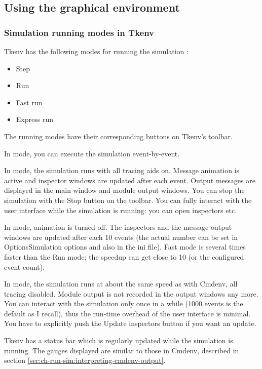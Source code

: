 \subsection{Using the graphical environment}

\subsubsection{Simulation running modes in Tkenv}


Tkenv has the following modes for running the simulation :

\begin{itemize}
   \item{Step}
   \item{Run}
   \item{Fast run}
   \item{Express run}
\end{itemize}


The running modes have their corresponding buttons on Tkenv's
toolbar.


In  mode, you can execute the simulation event-by-event.

In  mode, the simulation runs with all tracing aids on.
Message animation is active and inspector windows are updated
after each event. Output messages are displayed in the main window
and module output windows. You can stop the simulation with the
Stop button on the toolbar. You can fully interact with the user
interface while the simulation is running: you can open inspectors
etc.

In  mode, animation is turned off. The inspectors and
the message output windows are updated after each 10 events (the
actual number can be set in Options{\textbar}Simulation options and
also in the ini file). Fast mode is several times faster than
the Run mode; the speedup can get close to 10 (or the configured
event count).

In  mode, the simulation runs at about the same speed
as with Cmdenv, all tracing disabled. Module output is not recorded
in the output windows any more. You can interact with the simulation
only once in a while (1000 events is the default as I recall),
thus the run-time overhead of the user interface is minimal.
You have to explicitly push the Update inspectors button if you
want an update.

Tkenv has a status bar which is regularly updated while the simulation
is running. The gauges displayed are similar to those in Cmdenv,
described in section \ref{sec:ch-run-sim:interpreting-cmdenv-output}.


